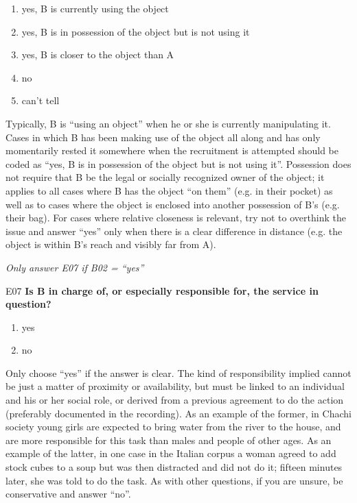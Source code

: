 \documentclass[output=paper]{langsci/langscibook}
\begin{document}
\begin{description}
\begin{enumerate}
\item {yes, B is currently using the object}
\item {yes, B is in possession of the object but is not using it}
\item {yes, B is closer to the object than A}
\item {no}
\item {can’t tell}
\end{enumerate}

Typically, B is “using an object” when he or she is currently manipulating it. Cases in which B has been making use of the object all along and has only momentarily rested it somewhere when the recruitment is attempted should be coded as “yes, B is in possession of the object but is not using it”. Possession does not require that B be the legal or socially recognized owner of the object; it applies to all cases where B has the object “on them” (e.g. in their pocket) as well as to cases where the object is enclosed into another possession of B’s (e.g. their bag). For cases where relative closeness is relevant, try not to overthink the issue and answer “yes” only when there is a clear difference in distance (e.g. the object is within B’s reach and visibly far from A).

\smallskip

\item
\textit{Only answer E07 if B02 = “yes”}

\item
E07  \textbf{Is B in charge of, or especially responsible for, the service in question?}

\begin{enumerate}
\item{yes}
\item {no}
\end{enumerate}

Only choose “yes” if the answer is clear. The kind of responsibility implied cannot be just a matter of proximity or availability, but must be linked to an individual and his or her social role, or derived from a previous agreement to do the action (preferably documented in the recording). As an example of the former, in Chachi society young girls are expected to bring water from the river to the house, and are more responsible for this task than males and people of other ages. As an example of the latter, in one case in the Italian corpus a woman agreed to add stock cubes to a soup but was then distracted and did not do it; fifteen minutes later, she was told to do the task. As with other questions, if you are unsure, be conservative and answer “no”.
\end{description}
\end{document}
